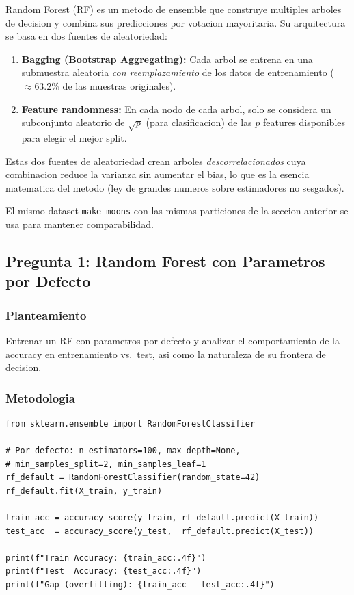 \documentclass[12pt,a4paper]{article}
\begin{document}
Random Forest (RF) es un metodo de ensemble que construye multiples arboles de decision y combina
sus predicciones por votacion mayoritaria. Su arquitectura se basa en dos fuentes de aleatoriedad:

\begin{enumerate}[label=\textbf{\arabic*.}]
  \item \textbf{Bagging (Bootstrap Aggregating):} Cada arbol se entrena en una submuestra aleatoria
    \textit{con reemplazamiento} de los datos de entrenamiento ($\approx 63.2\%$ de las muestras
    originales).
  \item \textbf{Feature randomness:} En cada nodo de cada arbol, solo se considera un subconjunto
    aleatorio de $\sqrt{p}$ (para clasificacion) de las $p$ features disponibles para elegir el
    mejor split.
\end{enumerate}

Estas dos fuentes de aleatoriedad crean arboles \textit{descorrelacionados} cuya combinacion
reduce la varianza sin aumentar el bias, lo que es la esencia matematica del metodo (ley de
grandes numeros sobre estimadores no sesgados).

El mismo dataset \texttt{make\_moons} con las mismas particiones de la seccion anterior se usa
para mantener comparabilidad.

\subsection{Pregunta 1: Random Forest con Parametros por Defecto}

\subsubsection*{Planteamiento}
Entrenar un RF con parametros por defecto y analizar el comportamiento de la accuracy en
entrenamiento vs.\ test, asi como la naturaleza de su frontera de decision.

\subsubsection*{Metodologia}

\begin{lstlisting}[caption={Random Forest con parametros por defecto}]
from sklearn.ensemble import RandomForestClassifier

# Por defecto: n_estimators=100, max_depth=None,
# min_samples_split=2, min_samples_leaf=1
rf_default = RandomForestClassifier(random_state=42)
rf_default.fit(X_train, y_train)

train_acc = accuracy_score(y_train, rf_default.predict(X_train))
test_acc  = accuracy_score(y_test,  rf_default.predict(X_test))

print(f"Train Accuracy: {train_acc:.4f}")
print(f"Test  Accuracy: {test_acc:.4f}")
print(f"Gap (overfitting): {train_acc - test_acc:.4f}")
\end{lstlisting}
\end{document}
